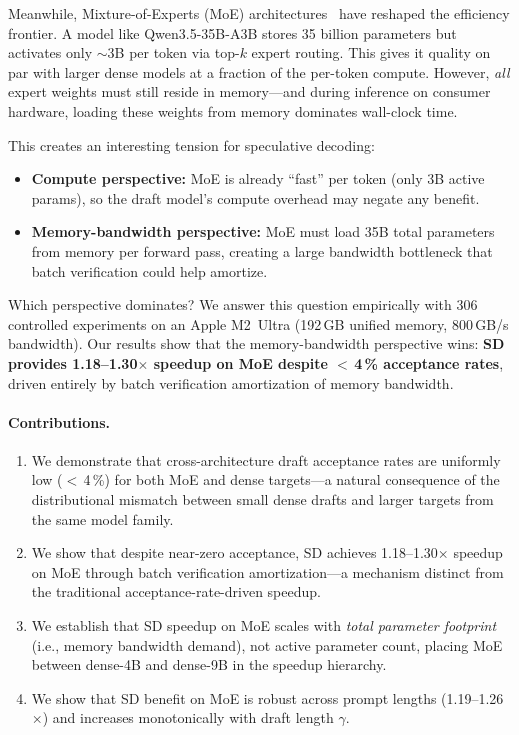 \documentclass[11pt,a4paper]{article}
\begin{document}
Meanwhile, Mixture-of-Experts (MoE) architectures~\cite{shazeer2017outrageously, fedus2022switch} have reshaped the efficiency frontier. A model like Qwen3.5-35B-A3B stores 35 billion parameters but activates only $\sim$3B per token via top-$k$ expert routing. This gives it quality on par with larger dense models at a fraction of the per-token compute. However, \emph{all} expert weights must still reside in memory---and during inference on consumer hardware, loading these weights from memory dominates wall-clock time.

This creates an interesting tension for speculative decoding:

\begin{itemize}[nosep,leftmargin=*]
  \item \textbf{Compute perspective:} MoE is already ``fast'' per token (only 3B active params), so the draft model's compute overhead may negate any benefit.
  \item \textbf{Memory-bandwidth perspective:} MoE must load 35B total parameters from memory per forward pass, creating a large bandwidth bottleneck that batch verification could help amortize.
\end{itemize}

Which perspective dominates? We answer this question empirically with 306 controlled experiments on an Apple M2~Ultra (192\,GB unified memory, 800\,GB/s bandwidth). Our results show that the memory-bandwidth perspective wins: \textbf{SD provides 1.18--1.30$\times$ speedup on MoE despite $<$\,4\,\% acceptance rates}, driven entirely by batch verification amortization of memory bandwidth.

\paragraph{Contributions.}
\begin{enumerate}[nosep,leftmargin=*]
  \item We demonstrate that cross-architecture draft acceptance rates are uniformly low ($<$\,4\,\%) for both MoE and dense targets---a natural consequence of the distributional mismatch between small dense drafts and larger targets from the same model family.
  \item We show that despite near-zero acceptance, SD achieves 1.18--1.30$\times$ speedup on MoE through batch verification amortization---a mechanism distinct from the traditional acceptance-rate-driven speedup.
  \item We establish that SD speedup on MoE scales with \emph{total parameter footprint} (i.e., memory bandwidth demand), not active parameter count, placing MoE between dense-4B and dense-9B in the speedup hierarchy.
  \item We show that SD benefit on MoE is robust across prompt lengths (1.19--1.26$\times$) and increases monotonically with draft length $\gamma$.
\end{enumerate}
\end{document}
